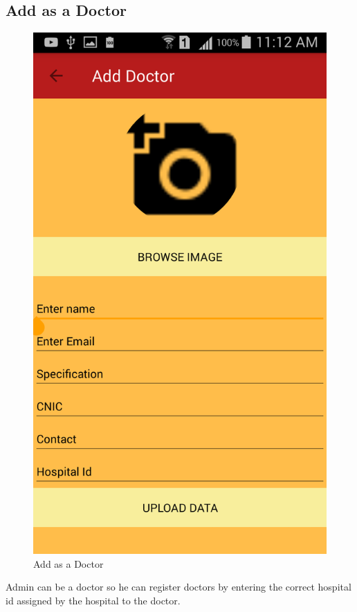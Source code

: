 \subsection{Add as a Doctor}
\begin{figure}[H]
  \centering
    \includegraphics[scale=0.3]{90AddDoctorprofile}
      \caption{Add as a Doctor}
\end{figure}
Admin can be a doctor so he can register doctors by entering the correct hospital id assigned by the hospital to the doctor.


